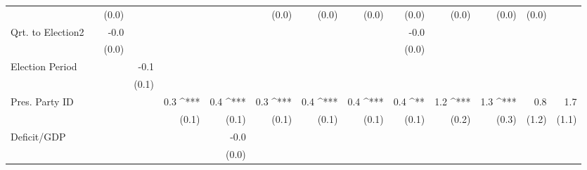 \documentclass[a4paper]{article}\usepackage{graphicx, color}
\begin{document}
\begin{table}[ht]
\begin{center}
{\begin{tabular}{ l D{.}{.}{1}D{.}{.}{1}D{.}{.}{1}D{.}{.}{1}D{.}{.}{1}D{.}{.}{1}D{.}{.}{1}D{.}{.}{1}D{.}{.}{1}D{.}{.}{1}D{.}{.}{1}D{.}{.}{1}D{.}{.}{1} }
                     &                 & (0.0)           &                 &                 &                 & (0.0)           & (0.0)           & (0.0)           & (0.0)           & (0.0)           & (0.0)           & (0.0)           &                \\ 
Qrt. to Election2    &                 & -0.0            &                 &                 &                 &                 &                 &                 & -0.0            &                 &                 &                 &                \\ 
                     &                 & (0.0)           &                 &                 &                 &                 &                 &                 & (0.0)           &                 &                 &                 &                \\ 
Election Period      &                 &                 & -0.1            &                 &                 &                 &                 &                 &                 &                 &                 &                 &                \\ 
                     &                 &                 & (0.1)           &                 &                 &                 &                 &                 &                 &                 &                 &                 &                \\ 
Pres. Party ID       &                 &                 &                 & 0.3 ^{***}      & 0.4 ^{***}      & 0.3 ^{***}      & 0.4 ^{***}      & 0.4 ^{***}      & 0.4 ^{**}       & 1.2 ^{***}      & 1.3 ^{***}      & 0.8             & 1.7            \\ 
                     &                 &                 &                 & (0.1)           & (0.1)           & (0.1)           & (0.1)           & (0.1)           & (0.1)           & (0.2)           & (0.3)           & (1.2)           & (1.1)          \\ 
Deficit/GDP          &                 &                 &                 &                 & -0.0            &                 &                 &                 &                 &                 &                 &                 &                \\ 
                     &                 &                 &                 &                 & (0.0)           &                 &                 &                 &                 &                 &                 &                 &                \\ 

\end{tabular}}
\end{center}
\end{table}
\end{document}
